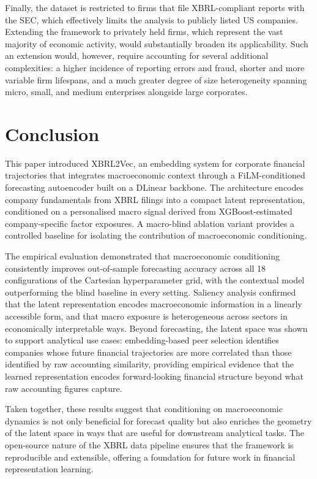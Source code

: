 \documentclass[a4paper,fleqn]{cas-dc}
\begin{document}
Finally, the dataset is restricted to firms that file XBRL-compliant reports with the SEC, which effectively limits the analysis to publicly listed US companies.  Extending the framework to privately held firms, which represent the vast majority of economic activity, would substantially broaden its applicability.  Such an extension would, however, require accounting for several additional complexities: a higher incidence of reporting errors and fraud, shorter and more variable firm lifespans, and a much greater degree of size heterogeneity spanning micro, small, and medium enterprises alongside large corporates.



\section{Conclusion} \label{sec:con}


This paper introduced XBRL2Vec, an embedding system for corporate financial trajectories that integrates macroeconomic context through a FiLM-conditioned forecasting autoencoder built on a DLinear backbone.  The architecture encodes company fundamentals from XBRL filings into a compact latent representation, conditioned on a personalised macro signal derived from XGBoost-estimated company-specific factor exposures.  A macro-blind ablation variant provides a controlled baseline for isolating the contribution of macroeconomic conditioning.

The empirical evaluation demonstrated that macroeconomic conditioning consistently improves out-of-sample forecasting accuracy across all 18 configurations of the Cartesian hyperparameter grid, with the contextual model outperforming the blind baseline in every setting.  Saliency analysis confirmed that the latent representation encodes macroeconomic information in a linearly accessible form, and that macro exposure is heterogeneous across sectors in economically interpretable ways.  Beyond forecasting, the latent space was shown to support analytical use cases: embedding-based peer selection identifies companies whose future financial trajectories are more correlated than those identified by raw accounting similarity, providing empirical evidence that the learned representation encodes forward-looking financial structure beyond what raw accounting figures capture.

Taken together, these results suggest that conditioning on macroeconomic dynamics is not only beneficial for forecast quality but also enriches the geometry of the latent space in ways that are useful for downstream analytical tasks.  The open-source nature of the XBRL data pipeline ensures that the framework is reproducible and extensible, offering a foundation for future work in financial representation learning.
\end{document}

